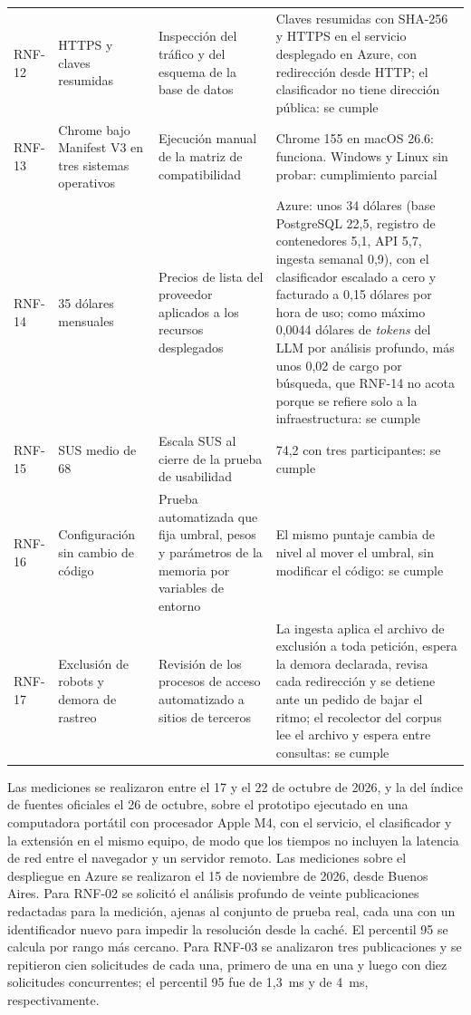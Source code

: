 \begin{footnotesize}
\begin{longtable}{@{}l p{3cm} p{4.6cm} p{5.1cm}@{}}
    RNF-12 & HTTPS y claves resumidas & Inspección del tráfico y del esquema de la base de datos & Claves resumidas con SHA-256 y HTTPS en el servicio desplegado en Azure, con redirección desde HTTP; el clasificador no tiene dirección pública: se cumple \\
    RNF-13 & Chrome bajo Manifest V3 en tres sistemas operativos & Ejecución manual de la matriz de compatibilidad & Chrome 155 en macOS 26.6: funciona. Windows y Linux sin probar: cumplimiento parcial \\
    RNF-14 & 35 dólares mensuales & Precios de lista del proveedor aplicados a los recursos desplegados & Azure: unos 34 dólares (base PostgreSQL 22,5, registro de contenedores 5,1, API 5,7, ingesta semanal 0,9), con el clasificador escalado a cero y facturado a 0,15 dólares por hora de uso; como máximo 0,0044 dólares de \textit{tokens} del LLM por análisis profundo, más unos 0,02 de cargo por búsqueda, que RNF-14 no acota porque se refiere solo a la infraestructura: se cumple \\
    RNF-15 & SUS medio de 68 & Escala SUS al cierre de la prueba de usabilidad & 74,2 con tres participantes: se cumple \\
    RNF-16 & Configuración sin cambio de código & Prueba automatizada que fija umbral, pesos y parámetros de la memoria por variables de entorno & El mismo puntaje cambia de nivel al mover el umbral, sin modificar el código: se cumple \\
    RNF-17 & Exclusión de robots y demora de rastreo & Revisión de los procesos de acceso automatizado a sitios de terceros & La ingesta aplica el archivo de exclusión a toda petición, espera la demora declarada, revisa cada redirección y se detiene ante un pedido de bajar el ritmo; el recolector del corpus lee el archivo y espera entre consultas: se cumple \\
    \hline
\end{longtable}
\end{footnotesize}

Las mediciones se realizaron entre el 17 y el 22 de octubre de 2026, y la del índice de fuentes oficiales el 26 de octubre, sobre el prototipo ejecutado en una computadora portátil con procesador Apple M4, con el servicio, el clasificador y la extensión en el mismo equipo, de modo que los tiempos no incluyen la latencia de red entre el navegador y un servidor remoto. Las mediciones sobre el despliegue en Azure se realizaron el 15 de noviembre de 2026, desde Buenos Aires. Para RNF-02 se solicitó el análisis profundo de veinte publicaciones redactadas para la medición, ajenas al conjunto de prueba real, cada una con un identificador nuevo para impedir la resolución desde la caché. El percentil 95 se calcula por rango más cercano. Para RNF-03 se analizaron tres publicaciones y se repitieron cien solicitudes de cada una, primero de una en una y luego con diez solicitudes concurrentes; el percentil 95 fue de 1,3~ms y de 4~ms, respectivamente.

